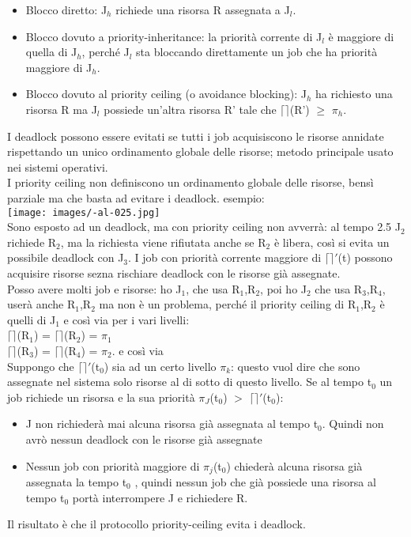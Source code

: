 \documentclass{article}
\begin{document}
\begin{itemize}
\item Blocco diretto: J$_{h}$ richiede una risorsa R assegnata a J$_{l}$.
\item Blocco dovuto a priority-inheritance: la priorità corrente di J$_{l}$ è maggiore di quella di J$_{h}$, perché J$_{l}$ sta bloccando direttamente un job che ha priorità maggiore di J$_{h}$.
\item Blocco dovuto al priority ceiling (o avoidance blocking): J$_{h}$ ha richiesto una risorsa R ma J$_{l}$ possiede un'altra risorsa R' tale che $\lceil\rceil$(R') $\geq$ $\pi_{h}$.
\end{itemize}
I deadlock possono essere evitati se tutti i job acquisiscono le risorse annidate rispettando un unico ordinamento globale delle risorse; metodo principale usato nei sistemi operativi.\\ I priority ceiling non definiscono un ordinamento globale delle risorse, bensì parziale ma che basta ad evitare i deadlock. esempio:\\
\texttt{[image: images/-al-025.jpg]}\\
Sono esposto ad un deadlock, ma con priority ceiling non avverrà: al tempo 2.5 J$_{2}$ richiede R$_{2}$, ma la richiesta viene rifiutata anche se R$_{2}$ è libera, così si evita un possibile deadlock con J$_{3}$. I job con priorità corrente maggiore di $\lceil\rceil'$(t) possono acquisire risorse sezna rischiare deadlock con le risorse già assegnate.\\ Posso avere molti job e risorse: ho J$_{1}$, che usa R$_{1}$,R$_{2}$, poi ho J$_{2}$ che usa R$_{3}$,R$_{4}$, userà anche R$_{1}$,R$_{2}$ ma non è un problema, perché il priority ceiling di R$_{1}$,R$_{2}$ è quelli di J$_{1}$ e così via per i vari livelli:\\
$\lceil\rceil$(R$_{1}$) = $\lceil\rceil$(R$_{2}$) = $\pi_{1}$\\
$\lceil\rceil$(R$_{3}$) = $\lceil\rceil$(R$_{4}$) = $\pi_{2}$.
e così via \\ Suppongo che $\lceil\rceil'$(t$_{0}$) sia ad un certo livello $\pi_{k}$: questo vuol dire che sono assegnate nel sistema solo risorse al di sotto di questo livello. Se al tempo t$_{0}$ un job richiede un risorsa e la sua priorità $\pi_{J}$(t$_{0}$) $>$ $\lceil\rceil'$(t$_{0}$):
\begin{itemize}
\item J non richiederà mai alcuna risorsa già assegnata al tempo t$_{0}$. Quindi non avrò nessun deadlock con le risorse già assegnate
\item Nessun job con priorità maggiore di $\pi_{j}$(t$_{0}$) chiederà alcuna risorsa già assegnata la tempo t$_{0}$ , quindi nessun job che già possiede una risorsa al tempo t$_{0}$ portà interrompere J e richiedere R.
\end{itemize}
Il risultato è che il protocollo priority-ceiling evita i deadlock.
\end{document}
